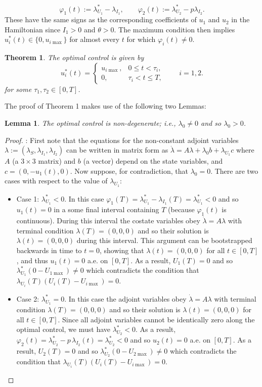 \documentclass[pdflatex]{sn-jnl}
\newtheorem{lemma}{Lemma}
\theoremstyle{thmstyleone}%
\newtheorem{theorem}{Theorem}%
\theoremstyle{thmstyletwo}%
\theoremstyle{thmstylethree}%
\begin{document}
\[
\varphi_1(t)
:=
\lambda_{U_1}^*-\lambda_{I_1},
\qquad
\varphi_2(t)
:=
\lambda_{U_2}^*-p\lambda_{I_2}.
\]
These have the same signs as the corresponding coefficients of \(u_1\)
and \(u_2\) in the Hamiltonian since \(I_1>0\) and \(\theta>0\). The maximum condition then implies $u_i^*(t) \in \{0, u_{i\max}\}$ for almost every $t$ for which $\varphi_i(t) \ne 0$.
%
\begin{theorem}
The optimal control is given by
\[
u_i^*(t)
=
\begin{cases}
u_{i\max}, & 0\leq t<\tau_i,\\
0, & \tau_i<t\leq T,
\end{cases}
\qquad i=1,2.
\]
for some \(\tau_1,\tau_2\in[0,T]\). 
\end{theorem}
%
The proof of Theorem 1 makes use of the following two Lemmas:
%
\begin{lemma}\label{lem:nondegen}
The optimal control is non-degenerate; i.e., $\lambda_0 \neq 0$ and so $\lambda_0>0$.
\end{lemma}
%
\begin{proof}: First note that the equations for the non-constant adjoint variables $\lambda:=(\lambda_S, \lambda_{I_1}, \lambda_{I_2})$ can be written in matrix form as $\dot \lambda=A \lambda+\lambda_0 b+ \lambda_{U_1}c$ where $A$ (a $3 \times 3$ matrix) and $b$ (a vector) depend on the state variables, and $c=(0,-u_1(t),0)$. Now suppose, for contradiction, that $\lambda_0=0$. There are two cases with respect to the value of $\lambda_{U_1}$:
\begin{itemize}[leftmargin=*]
\item Case 1: $\lambda_{U_1}^*<0$. In this case $\varphi_1(T)=\lambda_{U_1}^* - \lambda_{I_1}(T)=\lambda_{U_1}^*<0$ and so $u_1(t)=0$ in a some final interval containing $T$ (because $\varphi_1(t)$ is continuous). During this interval the costate variables obey $\dot \lambda=A \lambda$ with terminal condition $\lambda(T)=(0,0,0)$ and so their solution is $\lambda(t)=(0,0,0)$ during this interval. This argument can be bootstrapped backwards in time to $t=0$, showing that $\lambda(t)=(0,0,0)$ for all $t \in [0,T]$, and thus $u_1(t)=0$ a.e. on $ [0,T]$. As a result, $U_1(T)=0$ and so $\lambda_{U_1}^*(0 - U_{1\max}) \neq 0$ which contradicts the condition that $\lambda_{U_i}(T)(U_i(T) - U_{i\max}) = 0$.
\item Case 2: $\lambda_{U_1}^*=0$. In this case the adjoint variables obey $\dot \lambda=A \lambda$ with terminal condition $\lambda(T)=(0,0,0)$ and so their solution is $\lambda(t)=(0,0,0)$ for all $t \in [0,T]$. Since all adjoint variables cannot be identically zero along the optimal control, we must have $\lambda_{U_2}^*<0$. As a result, $\varphi_2(t) = \lambda_{U_2}^* - p\, \lambda_{I_2}(t)= \lambda_{U_2}^*<0$ and so $u_2(t)=0$ a.e. on $[0,T]$. As a result, $U_2(T)=0$ and so $\lambda_{U_2}^*(0 - U_{2\max}) \neq 0$ which contradicts the condition that $\lambda_{U_i}(T)(U_i(T) - U_{i\max}) = 0$.
\end{itemize}
\end{proof}
\end{document}
